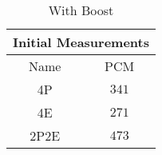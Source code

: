 \begin{table}[H]
    \centering
    \begin{tabular}{|| c | c ||}
    \hline
    \multicolumn{2}{||c||}{Initial Measurements} \\ [0.5ex] \hline\hline
    Name & PCM \\\hline
    4P & $341$ \\
    4E & $271$ \\
    2P2E& $473$ \\\hline
    \end{tabular}
    \caption*{With Boost}
    \label{tab:initial-measurements-bonus}
\end{table}